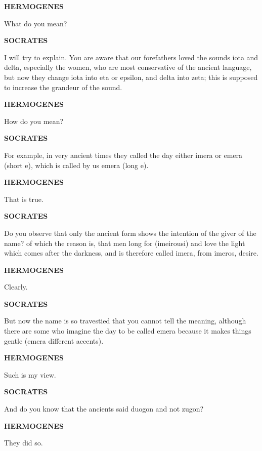 \documentclass[11pt,letter]{article}
\begin{document}
\par \textbf{HERMOGENES}
\par   What do you mean?

\par \textbf{SOCRATES}
\par   I will try to explain. You are aware that our forefathers loved the sounds iota and delta, especially the women, who are most conservative of the ancient language, but now they change iota into eta or epsilon, and delta into zeta; this is supposed to increase the grandeur of the sound.

\par \textbf{HERMOGENES}
\par   How do you mean?

\par \textbf{SOCRATES}
\par   For example, in very ancient times they called the day either imera or emera (short e), which is called by us emera (long e).

\par \textbf{HERMOGENES}
\par   That is true.

\par \textbf{SOCRATES}
\par   Do you observe that only the ancient form shows the intention of the giver of the name? of which the reason is, that men long for (imeirousi) and love the light which comes after the darkness, and is therefore called imera, from imeros, desire.

\par \textbf{HERMOGENES}
\par   Clearly.

\par \textbf{SOCRATES}
\par   But now the name is so travestied that you cannot tell the meaning, although there are some who imagine the day to be called emera because it makes things gentle (emera different accents).

\par \textbf{HERMOGENES}
\par   Such is my view.

\par \textbf{SOCRATES}
\par   And do you know that the ancients said duogon and not zugon?

\par \textbf{HERMOGENES}
\par   They did so.
\end{document}
